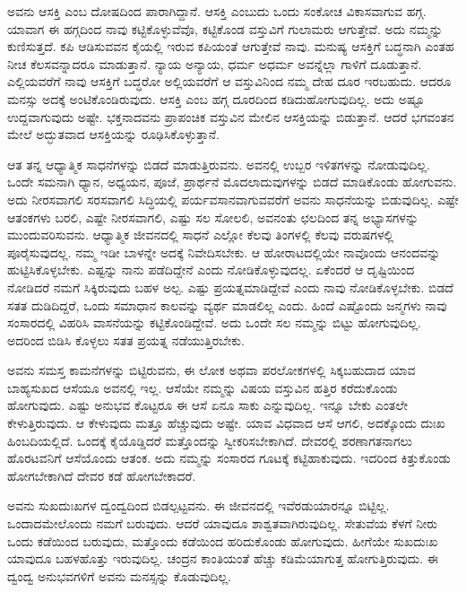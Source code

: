 ಅವನು ಆಸಕ್ತಿ ಎಂಬ ದೋಷದಿಂದ ಪಾರಾಗಿದ್ದಾನೆ. ಆಸಕ್ತಿ ಎಂಬುದು ಒಂದು ಸಂಕೋಚ ವಿಕಾಸವಾಗುವ ಹಗ್ಗ. ಯಾವಾಗ ಈ ಹಗ್ಗದಿಂದ ನಾವು ಕಟ್ಟಿಕೊಳ್ಳುವೆವೊ, ಕಟ್ಟಿಕೊಂಡ ವಸ್ತುವಿಗೆ ಗುಲಾಮರು ಆಗುತ್ತೇವೆ. ಅದು ನಮ್ಮನ್ನು ಕುಣಿಸುತ್ತದೆ. ಕಪಿ ಆಡಿಸುವವನ ಕೈಯಲ್ಲಿ ಇರುವ ಕಪಿಯಂತೆ ಆಗುತ್ತೇವೆ ನಾವು. ಮನುಷ್ಯ ಆಸಕ್ತಿಗೆ ಬದ್ಧನಾಗಿ ಎಂತಹ ನೀಚ ಕೆಲಸವನ್ನಾದರೂ ಮಾಡುತ್ತಾನೆ. ನ್ಯಾಯ ಅನ್ಯಾಯ, ಧರ್ಮ ಅಧರ್ಮ ಅವನ್ನೆಲ್ಲಾ ಗಾಳಿಗೆ ದೂಡುತ್ತಾನೆ. ಎಲ್ಲಿಯವರೆಗೆ ನಾವು ಆಸಕ್ತಿಗೆ ಬದ್ಧರೋ ಅಲ್ಲಿಯವರೆಗೆ ಆ ವಸ್ತುವಿನಿಂದ ನಮ್ಮ ದೇಹ ದೂರ ಇರಬಹುದು. ಆದರೂ ಮನಸ್ಸು ಅದಕ್ಕೆ ಅಂಟಿಕೊಂಡಿರುವುದು. ಆಸಕ್ತಿ ಎಂಬ ಹಗ್ಗ ದೂರದಿಂದ ಕಡಿದುಹೋಗುವುದಿಲ್ಲ. ಅದು ಅಷ್ಟೂ ಉದ್ದವಾಗುವುದು ಅಷ್ಟೇ. ಭಕ್ತನಾದವನು ಪ್ರಾಪಂಚಿಕ ವಸ್ತುವಿನ ಮೇಲಿನ ಆಸಕ್ತಿಯನ್ನು ಬಿಡುತ್ತಾನೆ. ಆದರೆ ಭಗವಂತನ ಮೇಲೆ ಅದ್ಭುತವಾದ ಆಸಕ್ತಿಯನ್ನು ರೂಢಿಸಿಕೊಳ್ಳುತ್ತಾನೆ.

ಆತ ತನ್ನ ಆಧ್ಯಾತ್ಮಿಕ ಸಾಧನೆಗಳನ್ನು ಬಿಡದೆ ಮಾಡುತ್ತಿರುವನು. ಅವನಲ್ಲಿ ಉಬ್ಬರ ಇಳಿತಗಳನ್ನು ನೋಡುವುದಿಲ್ಲ. ಒಂದೇ ಸಮನಾಗಿ ಧ್ಯಾನ, ಅಧ್ಯಯನ, ಪೂಜೆ, ಪ್ರಾರ್ಥನೆ ಮೊದ\-ಲಾದುವುಗಳನ್ನು ಬಿಡದೆ ಮಾಡಿಕೊಂಡು ಹೋಗುವನು. ಅದು ನೀರಸವಾಗಲಿ ಸರಸವಾಗಲಿ ಸಿದ್ಧಿಯಲ್ಲಿ ಪರ್ಯವಸಾನವಾಗುವವರೆಗೆ ಅವನು ಸಾಧನೆಯನ್ನು ಬಿಡುವುದಿಲ್ಲ. ಎಷ್ಟೇ ಆತಂಕಗಳು ಬರಲಿ, ಎಷ್ಟೇ ನೀರಸವಾಗಲಿ, ಎಷ್ಟು ಸಲ ಸೋಲಲಿ, ಅವನಂತು ಛಲದಿಂದ ತನ್ನ ಅಭ್ಯಾಸಗಳನ್ನು ಮುಂದುವರಿಸುವನು. ಆಧ್ಯಾತ್ಮಿಕ ಜೀವನದಲ್ಲಿ ಸಾಧನೆ ಎಲ್ಲೋ ಕೆಲವು ತಿಂಗಳಲ್ಲಿ ಕೆಲವು ವರುಷಗಳಲ್ಲಿ ಪೂರೈಸುವುದಲ್ಲ. ನಮ್ಮ ಇಡೀ ಬಾಳನ್ನೇ ಅದಕ್ಕೆ ನಿವೇದಿಸಬೇಕು. ಆ ಹೋರಾಟದಲ್ಲಿಯೇ ನಾವೊಂದು ಆನಂದವನ್ನು ಹುಟ್ಟಿಸಿಕೊಳ್ಳಬೇಕು. ಎಷ್ಟನ್ನು ನಾನು ಪಡೆದಿದ್ದೇನೆ ಎಂದು ನೋಡಿಕೊಳ್ಳುವುದಲ್ಲ. ಏಕೆಂದರೆ ಆ ದೃಷ್ಟಿಯಿಂದ ನೋಡಿದರೆ ನಮಗೆ ಸಿಕ್ಕಿರುವುದು ಬಹಳ ಅಲ್ಪ. ಎಷ್ಟು ಪ್ರಯತ್ನಮಾಡಿದ್ದೇವೆ ಎಂದು ನಾವು ನೋಡಿಕೊಳ್ಳಬೇಕು. ಬಿಡದೆ ಸತತ ದುಡಿದಿದ್ದರೆ, ಒಂದು ಸಮಾಧಾನ ಕಾಲವನ್ನು ವ್ಯರ್ಥ ಮಾಡಲಿಲ್ಲ ಎಂದು. ಹಿಂದೆ ಎಷ್ಟೊಂದು ಜನ್ಮಗಳು ನಾವು ಸಂಸಾರದಲ್ಲಿ ವಿಹರಿಸಿ ವಾಸನೆಯನ್ನು ಕಟ್ಟಿಕೊಂಡಿದ್ದೇವೆ. ಅದು ಒಂದೇ ಸಲ ನಮ್ಮನ್ನು ಬಿಟ್ಟು ಹೋಗುವುದಿಲ್ಲ. ಅದರಿಂದ ಬಿಡಿಸಿ ಕೊಳ್ಳಲು ಸತತ ಪ್ರಯತ್ನ ನಡೆಯುತ್ತಿರಬೇಕು.

ಅವನು ಸಮಸ್ತ ಕಾಮನೆಗಳನ್ನು ಬಿಟ್ಟಿರುವನು, ಈ ಲೋಕ ಅಥವಾ ಪರಲೋಕಗಳಲ್ಲಿ ಸಿಕ್ಕಬಹುದಾದ ಯಾವ ಬಾಹ್ಯಸುಖದ ಆಸೆಯೂ ಅವನಲ್ಲಿ ಇಲ್ಲ. ಆಸೆಯೇ ನಮ್ಮನ್ನು ವಿಷಯ ವಸ್ತುವಿನ ಹತ್ತಿರ ಕರೆದುಕೊಂಡು ಹೋಗುವುದು. ಎಷ್ಟು ಅನುಭವ ಕೊಟ್ಟರೂ ಈ ಆಸೆ ಏನೂ ಸಾಕು ಎನ್ನುವುದಿಲ್ಲ. ಇನ್ನೂ ಬೇಕು ಎಂತಲೇ ಕೇಳುತ್ತಿರುವುದು. ಆ ಕೇಳುವುದು ಮತ್ತೂ ಹೆಚ್ಚುವುದು ಅಷ್ಟೇ. ಯಾವ ವಿಧವಾದ ಆಸೆ ಆಗಲಿ, ಅದಕ್ಕೊಂದು ದುಃಖ ಹಿಂಬದಿಯಲ್ಲಿದೆ. ಒಂದಕ್ಕೆ ಕೈಯೊಡ್ಡಿದರೆ ಮತ್ತೊಂದನ್ನು ಸ್ವೀಕರಿಸಬೇಕಾಗಿದೆ. ದೇವರಲ್ಲಿ ಶರಣಾಗತನಾಗಲು ಹೊರಟವನಿಗೆ ಆಸೆಯೊಂದು ಆತಂಕ. ಅದು ನಮ್ಮನ್ನು ಸಂಸಾರದ ಗೂಟಕ್ಕೆ ಕಟ್ಟಿಹಾಕುವುದು. ಇದರಿಂದ ಕಿತ್ತುಕೊಂಡು ಹೋಗಬೇಕಾಗಿದೆ ದೇವರ ಕಡೆ ಹೋಗಬೇಕಾದರೆ.

ಅವನು ಸುಖದುಃಖಗಳ ದ್ವಂದ್ವದಿಂದ ಬಿಡಲ್ಪಟ್ಟವನು. ಈ ಜೀವನದಲ್ಲಿ ಇವೆರಡು\break ಯಾರನ್ನೂ ಬಿಟ್ಟಿಲ್ಲ. ಒಂದಾದಮೇಲೊಂದು ನಮಗೆ ಬರುವುದು. ಆದರೆ ಯಾವುದೂ ಶಾಶ್ವತವಾಗಿರುವುದಿಲ್ಲ. ಸೇತುವೆಯ ಕೆಳಗೆ ನೀರು ಒಂದು ಕಡೆಯಿಂದ ಬರುವುದು, ಮತ್ತೊಂದು ಕಡೆಯಿಂದ ಹರಿದುಕೊಂಡು ಹೋಗುವುದು. ಹೀಗೆಯೇ ಸುಖದುಃಖ ಯಾವುದೂ ಬಹಳಹೊತ್ತು ಇರುವುದಿಲ್ಲ. ಚಂದ್ರನ ಕಾಂತಿಯಂತೆ ಹೆಚ್ಚು ಕಡಿಮೆಯಾಗುತ್ತ ಹೋಗುತ್ತಿರುವುದು. ಈ ದ್ವಂದ್ವ ಅನುಭವಗಳಿಗೆ ಅವನು ಮನಸ್ಸನ್ನು ಕೊಡುವುದಿಲ್ಲ.

